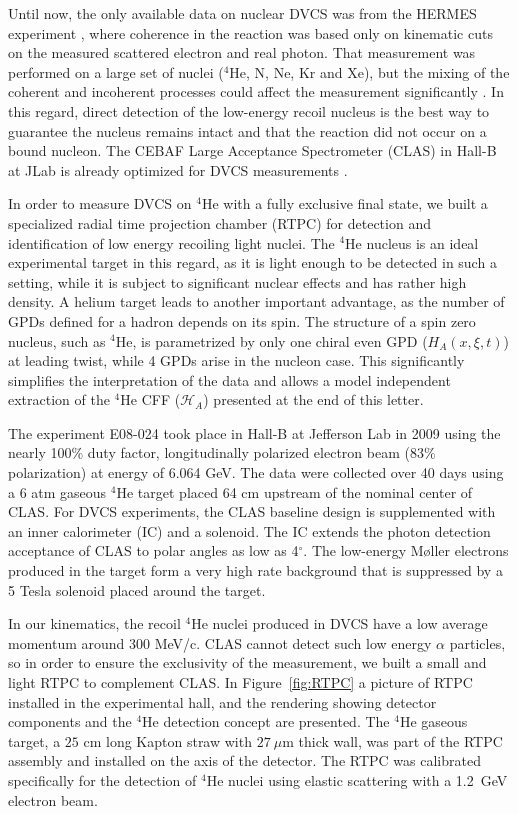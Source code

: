 \documentclass[twocolumn,nofootinbib,showpacs,prl,superscriptaddress,secnumarabic,amssymb,nobibnotes,aps,floatfix]{revtex4}
\begin{document}
Until now, the only available data on nuclear DVCS was from the 
HERMES experiment \cite{Ellinghaus:2002zw}, where coherence in the reaction was based only on 
kinematic cuts on the measured scattered electron and real photon. That 
measurement was performed on a large set of nuclei ($^4$He, N, Ne, Kr and Xe), 
but the mixing of the coherent and incoherent processes could affect the
measurement significantly \cite{Guzey:2003jh}. In this regard, direct detection 
of the low-energy recoil nucleus is the best way to guarantee the nucleus 
remains intact and that the reaction did not occur on a bound nucleon. The 
CEBAF Large Acceptance Spectrometer (CLAS) in Hall-B at JLab is already 
optimized for DVCS measurements 
\cite{Girod:2007aa,Gavalian:2009,Seder:2015,Pisano:2015,Jo:2015ema}.

In order to measure DVCS on $^4$He with a fully exclusive final state, we 
built a specialized radial time projection chamber (RTPC) for detection and identification of
low energy recoiling light nuclei. The $^4$He nucleus is an ideal experimental target in this regard, as 
it is light enough to be detected in such a setting, while it
is subject to significant nuclear effects \cite{JSeely} and has rather high 
density.  A helium target leads to another important advantage, as the number of GPDs 
defined for a hadron depends on its spin. The structure of a spin zero nucleus, such as 
$^4$He, is parametrized by only one chiral even GPD ($H_{A}(x,\xi,t)$) at 
leading twist, while 4 GPDs arise in the nucleon case. This significantly
simplifies the interpretation of the data and allows a model independent
extraction of the $^4$He CFF ($\mathcal{H}_{A}$) presented at the
end of this letter. 


The experiment E08-024 took place in Hall-B at Jefferson Lab in 2009 using the 
nearly 100\% duty factor, longitudinally polarized electron beam (83$\%$ 
polarization) at energy of 6.064 GeV. The data were collected over 40 days 
using a 6 atm gaseous $^4$He target placed 64 cm upstream of the nominal center of CLAS. For DVCS 
experiments, the CLAS baseline design \cite{Mecking:2003zu} is supplemented 
with an inner calorimeter (IC) and a solenoid. The IC extends the photon 
detection acceptance of CLAS to polar angles as low as 4$^{\circ}$. The 
low-energy M\o{}ller electrons produced in the target form a very high rate 
background that is suppressed by a 5 Tesla solenoid placed around the target. 

In our kinematics, the recoil $^4$He nuclei produced in DVCS have a low average 
momentum around 300 MeV/c. CLAS cannot detect such low energy $\alpha$ 
particles, so in order to ensure the exclusivity of the measurement, we built a 
small and light RTPC to complement CLAS. In Figure~\ref{fig:RTPC} a picture of 
RTPC installed in the experimental hall, and the rendering showing detector 
components and the $^4$He detection concept are presented. The $^4$He gaseous 
target, a $25$ cm long Kapton straw with $27~\mu$m thick wall, was part of the RTPC
assembly and installed on the axis of the detector. The RTPC was calibrated specifically for the detection 
of $^4$He nuclei using elastic scattering with a 1.2~GeV electron beam.
\end{document}
